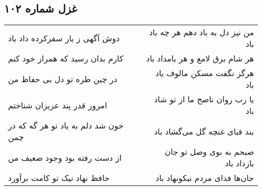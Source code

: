 \begin{center}
\section*{غزل شماره ۱۰۲}
\label{sec:sh102}
\begin{longtable}{l p{0.5cm} r}
دوش آگهی ز یار سفرکرده داد باد
&&
من نیز دل به باد دهم هر چه باد باد
\\
کارم بدان رسید که همراز خود کنم
&&
هر شام برق لامع و هر بامداد باد
\\
در چین طره تو دل بی حفاظ من
&&
هرگز نگفت مسکن مالوف یاد باد
\\
امروز قدر پند عزیزان شناختم
&&
یا رب روان ناصح ما از تو شاد باد
\\
خون شد دلم به یاد تو هر گه که در چمن
&&
بند قبای غنچه گل می‌گشاد باد
\\
از دست رفته بود وجود ضعیف من
&&
صبحم به بوی وصل تو جان بازداد باد
\\
حافظ نهاد نیک تو کامت برآورد
&&
جان‌ها فدای مردم نیکونهاد باد
\\
\end{longtable}
\end{center}
